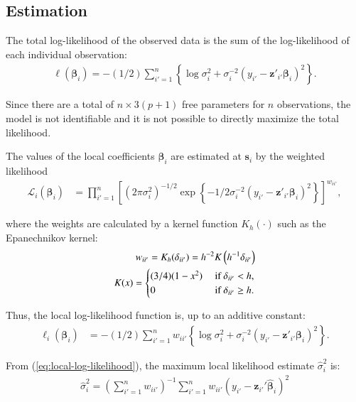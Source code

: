 \documentclass[authoryear, review, 11pt]{elsarticle}
\begin{document}
  \subsection{Estimation}		
  The total log-likelihood of the observed data is the sum of the log-likelihood of each individual observation:
  \begin{align} \label{eq:coefficients}
  	\ell(\bm{\beta}_i) = -(1/2) \sum_{i'=1}^n \left\{ \log{\sigma^2_i}  + \sigma^{-2}_i  \left(y_{i'} - \bm{z}'_{i'} \bm{\beta}_i \right)^2 \right\}.
	\end{align}
	
	Since there are a total of $n \times 3(p+1)$ free parameters for $n$ observations, the model is not identifiable and it is not possible to directly maximize the total likelihood.
  
  The values of the local coefficients $\bm{\beta}_i$ are estimated at $\bm{s}_i$ by the weighted likelihood
  \begin{align}\label{eq:local-likelihood}
		\mathcal{L}_i \left(\bm{\beta}_i \right) &= \prod_{i'=1}^n \left[ \left(2 \pi \sigma^2_i  \right)^{-1/2}  \exp\left\{- 1/2 \sigma^{-2}_i  \left(y_{i'} - \bm{z}'_{i'} \bm{\beta}_i \right)^2 \right\} \right] ^ {w_{ii'}},
	\end{align}
  
  where the weights are calculated by a kernel function $K_h(\cdot)$ such as the Epanechnikov kernel:
  \begin{align}\label{eq:epanechnikov}
	  w_{ii'} = K_h(\delta_{ii'}) = h^{-2} K\left( h^{-1} \delta_{ii'} \right) \notag \\
    K(x) = \begin{cases} (3/4) (1-x^2) &\mbox{ if } \delta_{ii'} < h, \\ 0 &\mbox{ if } \delta_{ii'} \geq h. \end{cases}
	\end{align}
  
  Thus, the local log-likelihood function is, up to an additive constant: 
  \begin{align}\label{eq:local-log-likelihood}
		\ell_i\left(\bm{\beta}_i\right) &= -(1/2) \sum_{i'=1}^n w_{ii'} \left\{ \log{\sigma^2_i}  + \sigma^{-2}_i  \left(y_{i'} - \bm{z}'_{i'} \bm{\beta}_i \right)^2 \right\}.
	\end{align}
	

	
	 From (\ref{eq:local-log-likelihood}), the maximum local likelihood estimate $\hat{\sigma}_i^2$ is:	 
	 \begin{align}
	 	\hat{\sigma}_i^2 = \left(\sum \limits_{i'=1}^{n} w_{ii'} \right)^{-1} \sum \limits_{i'=1}^n w_{ii'}\left(y_{i'} - \bm{z}_{i'}'\hat{\bm{\beta}}_i\right)^2
	\end{align}
	 
\end{document}
